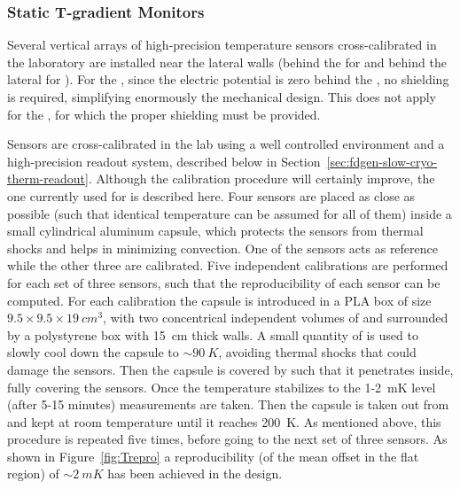 
\subsubsection{Static T-gradient Monitors}
\label{sp-cisc-thermom-static-t}

Several vertical arrays of high-precision temperature sensors cross-calibrated in the laboratory are installed near the lateral walls
(behind the  for \single and behind the lateral %
 for \dual). 
For the , since the electric potential is zero behind the , no \efield shielding is required, simplifying enormously the mechanical design.
This does not apply for the , for which the proper shielding must be provided. 


Sensors are cross-calibrated in the lab using a well controlled environment and a high-precision readout system, described below in Section~\ref{sec:fdgen-slow-cryo-therm-readout}. %
Although the calibration procedure will certainly improve, the one currently used for  is described here.
Four sensors are placed as close as possible (such that identical temperature can be assumed for all of them) inside a small cylindrical aluminum capsule,
which protects the sensors from thermal shocks and helps in minimizing convection.
One of the sensors acts as reference while the other three are %
calibrated. Five independent calibrations
are performed for each set of three sensors, such that the reproducibility of each sensor can be computed. For each calibration 
the capsule is introduced in a PLA box of size \(9.5\times9.5\times\SI{19}{cm^3}\), with two concentrical independent volumes of \lar
and surrounded by a polystyrene box with \SI{15}{cm} thick walls. A small quantity of \lar is used to slowly
cool down the capsule to $\sim\SI{90}{K}$, avoiding thermal shocks that could damage the sensors.
Then the capsule is covered by
  \lar such that it penetrates
inside, fully covering the sensors. Once the temperature stabilizes to the 1-\SI{2}{mK} level (after 5-15 minutes) measurements are taken. Then the capsule is taken out from \lar
and kept at room temperature until it reaches \SI{200}{K}. As mentioned above, this procedure is repeated five times, before going to the next set of three sensors.  
As shown in Figure~\ref{fig:Trepro} a reproducibility (\rms of the mean offset in the flat region) of $\sim \SI{2}{mK}$ has been achieved in the  design.  

